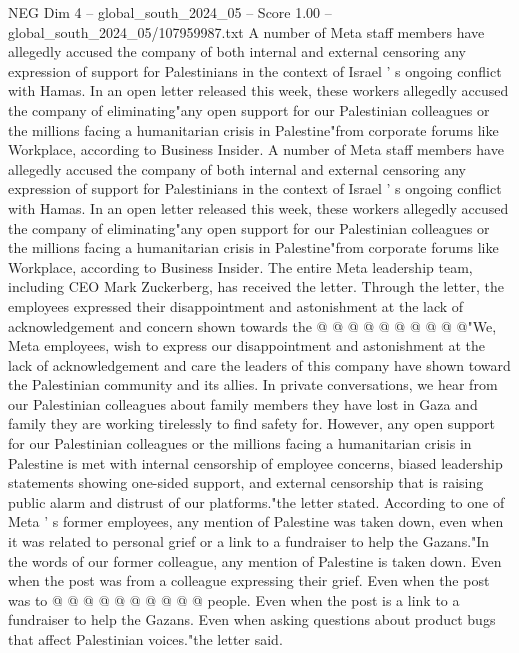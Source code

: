 \begin{textsample}{NEG Dim 4 – global\_south\_2024\_05 – Score 1.00 – global\_south\_2024\_05/107959987.txt}  \label{ex:f4_neg_277}
A number of Meta staff members have allegedly accused the company of both internal and external censoring any expression of support for Palestinians in the context of Israel ' s ongoing conflict with Hamas.
In an open letter released this week, these workers allegedly accused the company of eliminating"any open support for our Palestinian colleagues or the millions facing a humanitarian crisis in Palestine"from corporate forums like Workplace, according to Business Insider.
A number of Meta staff members have allegedly accused the company of both internal and external censoring any expression of support for Palestinians in the context of Israel ' s ongoing conflict with Hamas.
In an open letter released this week, these workers allegedly accused the company of eliminating"any open support for our Palestinian colleagues or the millions facing a humanitarian crisis in Palestine"from corporate forums like Workplace, according to Business Insider.
The entire Meta leadership team, including CEO Mark Zuckerberg, has received the letter.
Through the letter, the employees expressed their disappointment and astonishment at the lack of acknowledgement and concern shown towards the @ @ @ @ @ @ @ @ @ @"We, Meta employees, wish to express our disappointment and astonishment at the lack of acknowledgement and care the leaders of this company have shown toward the Palestinian community and its allies.
In private conversations, we hear from our Palestinian colleagues about family members they have lost in Gaza and family they are working tirelessly to find safety for.
However, any open support for our Palestinian colleagues or the millions facing a humanitarian crisis in Palestine is met with internal censorship of employee concerns, biased leadership statements showing one-sided support, and external censorship that is raising public alarm and distrust of our platforms."the letter stated.
According to one of Meta ' s former employees, any mention of Palestine was taken down, even when it was related to personal grief or a link to a fundraiser to help the Gazans."In the words of our former colleague, any mention of Palestine is taken down.
Even when the post was from a colleague expressing their grief.
Even when the post was to @ @ @ @ @ @ @ @ @ @ people.
Even when the post is a link to a fundraiser to help the Gazans.
Even when asking questions about product bugs that affect Palestinian voices."the letter said.

\end{textsample}
